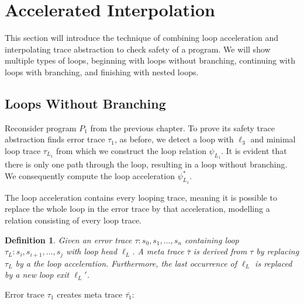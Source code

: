 \documentclass{article}
\newtheorem{mydef}{Definition}
\begin{document}
\section{Accelerated Interpolation}\label{sec:accelinterpol}
This section will introduce the technique of combining loop acceleration and interpolating trace abstraction to check safety of a program. We will show multiple types of loops, beginning with loops without branching, continuing with loops with branching, and finishing with nested loops. \\

\subsection{Loops Without Branching}

Reconsider program $P_1$ from the previous chapter. To prove its safety trace abstraction finds error trace $\tau_1$, as before, we detect a loop with  $\ell_3$ and minimal loop trace $\tau_{L_1}$ from which we construct the loop relation $\psi_{L_1}$. It is evident that there is only one path through the loop, resulting in a loop without branching. We consequently compute the loop acceleration $\psi^*_{L_1}$. \par

The loop acceleration contains every looping trace, meaning it is possible to replace the whole loop in the error trace by that acceleration, modelling a relation consisting of every loop trace.

\begin{mydef}
    Given an error trace $\tau: s_0, s_1, \ldots, s_n$ containing loop $\tau_L: s_i, s_{i+1}, \ldots, s_j$ with loop head $\ell_L$. A meta trace $\bar{\tau}$ is derived from $\tau$ by replacing $\tau_L$ by a the loop acceleration. Furthermore, the last occurrence of $\ell_L$ is replaced by a new loop exit $\ell_L'$.
\end{mydef}

Error trace $\tau_1$ creates meta trace $\bar{\tau_1}$:
\end{document}
